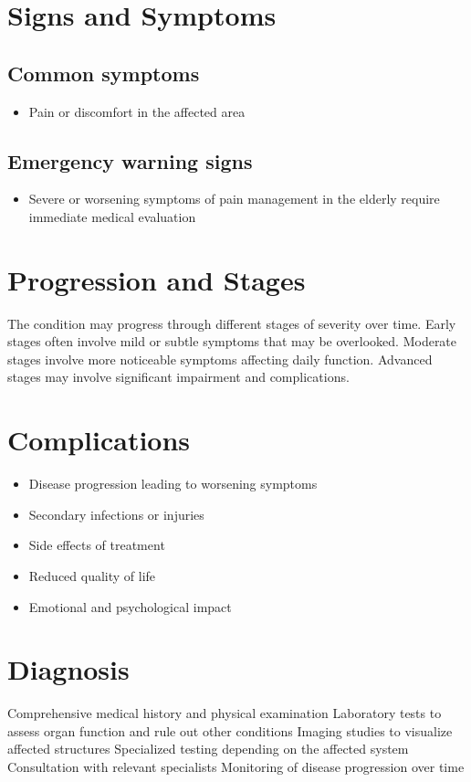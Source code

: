 \section{Signs and Symptoms}

\subsection{Common symptoms}
\begin{itemize}[noitemsep]
  \item Pain or discomfort in the affected area
  \end{itemize}

\subsection{Emergency warning signs}
\begin{itemize}[noitemsep]
  \item Severe or worsening symptoms of pain management in the elderly require immediate medical evaluation
\end{itemize}
\section{Progression and Stages}
The condition may progress through different stages of severity over time. Early stages often involve mild or subtle symptoms that may be overlooked. Moderate stages involve more noticeable symptoms affecting daily function. Advanced stages may involve significant impairment and complications.
\section{Complications}
\begin{itemize}[noitemsep]
  \item Disease progression leading to worsening symptoms
  \item Secondary infections or injuries
  \item Side effects of treatment
  \item Reduced quality of life
  \item Emotional and psychological impact
\end{itemize}
\section{Diagnosis}
Comprehensive medical history and physical examination Laboratory tests to assess organ function and rule out other conditions Imaging studies to visualize affected structures Specialized testing depending on the affected system Consultation with relevant specialists Monitoring of disease progression over time

